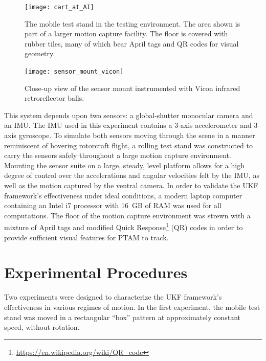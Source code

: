 \begin{figure}
  \centering
    \texttt{[image: cart\_at\_AI]}
  \caption[Testing Environment]{The mobile test stand in the testing environment. The area shown is part of a larger motion capture facility. The floor is covered with rubber tiles, many of which bear April tags and QR codes for visual geometry.}
  \label{fig:cart_at_AI}
\end{figure}

\begin{figure}
  \centering
    \texttt{[image: sensor\_mount\_vicon]}
  \caption[Sensor Mount Instrumented with Retroreflectors]{Close-up view of the sensor mount instrumented with Vicon infrared retroreflector balls.}
  \label{fig:sensor_mount_vicon}
\end{figure}

This system depends upon two sensors: a global-shutter monocular camera and an IMU. The IMU used in this experiment contains a 3-axis accelerometer and 3-axis gyroscope. To simulate both sensors moving through the scene in a manner reminiscent of hovering rotorcraft flight, a rolling test stand was constructed to carry the sensors safely throughout a large motion capture environment. Mounting the sensor suite on a large, steady, level platform allows for a high degree of control over the accelerations and angular velocities felt by the IMU, as well as the motion captured by the ventral camera. In order to validate the UKF framework's effectiveness under ideal conditions, a modern laptop computer containing an Intel i7 processor with 16~GB of RAM was used for all computations. The floor of the motion capture environment was strewn with a mixture of April tags and modified Quick Response\footnote{\url{https://en.wikipedia.org/wiki/QR_code}} (QR) codes in order to provide sufficient visual features for PTAM to track.

\section{Experimental Procedures}

Two experiments were designed to characterize the UKF framework's effectiveness in various regimes of motion. In the first experiment, the mobile test stand was moved in a rectangular ``box'' pattern at approximately constant speed, without rotation.

